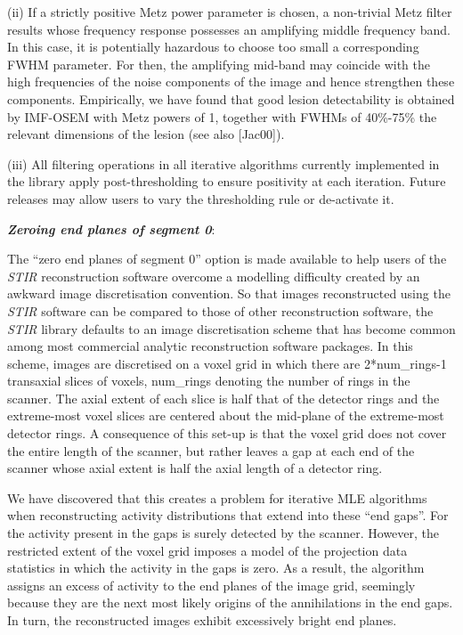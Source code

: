 \documentclass{article}
\begin{document}
{(ii) If a strictly positive Metz power parameter is chosen, a 
non-trivial Metz filter results whose frequency response possesses 
an amplifying middle frequency band. In this case, it is potentially 
hazardous to choose too small a corresponding FWHM parameter. 
For then, the amplifying mid-band may coincide with the high 
frequencies of the noise components of the image and hence strengthen 
these components. Empirically, we have found that good lesion 
detectability is obtained by IMF-OSEM with Metz powers of 1, 
together with FWHMs of 40\%-75\% the relevant dimensions of the 
lesion (see also [Jac00]).



(iii) All filtering operations in all iterative algorithms currently 
implemented in the library apply post-thresholding 
to ensure positivity at each iteration. Future 
releases may allow users to vary the thresholding rule or de-activate 
it.


\textbf{\textit{Zeroing end planes of segment 0}}: 


The ``zero end planes of segment 0'' option is made available 
to help users of the \textit{STIR} reconstruction software overcome 
a modelling difficulty created by an awkward image discretisation 
convention. So that images reconstructed using the \textit{STIR} software 
can be compared to those of other reconstruction software, the \textit{STIR} 
library defaults to an image discretisation scheme that has become 
common among most commercial analytic reconstruction software 
packages. In this scheme, images are discretised on a voxel grid 
in which there are 2*num\_rings-1 transaxial slices of voxels, 
num\_rings denoting the number of rings in the scanner. The axial 
extent of each slice is half that of the detector rings and the 
extreme-most voxel slices are centered about the mid-plane of 
the extreme-most detector rings. A consequence of this set-up 
is that the voxel grid does not cover the entire length of the 
scanner, but rather leaves a gap at each end of the scanner whose 
axial extent is half the axial length of a detector ring.



We have discovered that this creates a problem for iterative 
MLE algorithms when reconstructing activity distributions that 
extend into these ``end gaps''. For the activity present in the 
gaps is surely detected by the scanner. However, the restricted 
extent of the voxel grid imposes a model of the projection data 
statistics in which the activity in the gaps is zero. As a result, 
the algorithm assigns an excess of activity to the end planes 
of the image grid, seemingly because they are the next most likely 
origins of the annihilations in the end gaps. In turn, the reconstructed 
images exhibit excessively bright end planes.



}
\end{document}
